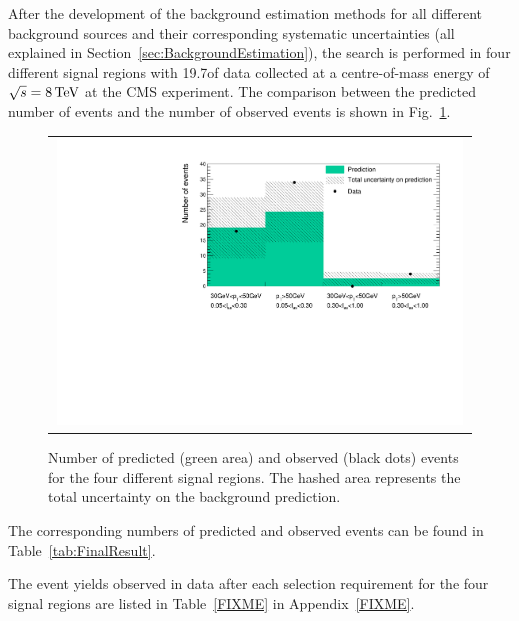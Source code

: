 After the development of the background estimation methods for all different background sources and their corresponding systematic uncertainties (all explained in Section~\ref{sec:BackgroundEstimation}), 
the search is performed in four different signal regions with 19.7\fbinv of data collected at a centre-of-mass energy of $\sqrt{s} = 8\,\text{Te}\kern-0.06667em\text{V}$ at the CMS experiment.
The comparison between the predicted number of events and the number of observed events is shown in Fig.~\ref{fig:FinalResult}.
\begin{figure}[!b]
  \centering 
  \begin{tabular}{c}
    \includegraphics[width=0.99\textwidth]{figures/analysis/Results/FinalResultPlot.pdf} 
  \end{tabular}
  \caption{Number of predicted (green area) and observed (black dots) events for the four different signal regions. The hashed area represents the total uncertainty on the background prediction.}
  \label{fig:FinalResult}
\end{figure} 
The corresponding numbers of predicted and observed events can be found in Table~\ref{tab:FinalResult}.
\renewcommand{\arraystretch}{1.5}
\begin{table}[!h]
\centering
\caption{Number of predicted and observed events for the four different signal regions.}
\label{tab:FinalResult}
\end{table}
The event yields observed in data after each selection requirement for the four signal regions are listed in Table~\ref{FIXME} in Appendix~\ref{FIXME}.

